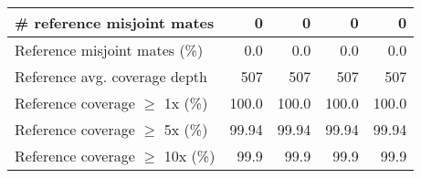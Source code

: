 \documentclass[12pt,a4paper]{article}
\begin{document}
\begin{table}[ht]
\begin{center}
\begin{tabular}{|l*{4}{|r}|}
\# reference misjoint mates & 0 & 0 & 0 & 0 \\ \hline
Reference misjoint mates (\%) & 0.0 & 0.0 & 0.0 & 0.0 \\ \hline
Reference avg. coverage depth & 507 & 507 & 507 & 507 \\ \hline
Reference coverage $\geq$ 1x (\%) & 100.0 & 100.0 & 100.0 & 100.0 \\ \hline
Reference coverage $\geq$ 5x (\%) & 99.94 & 99.94 & 99.94 & 99.94 \\ \hline
Reference coverage $\geq$ 10x (\%) & 99.9 & 99.9 & 99.9 & 99.9 \\ \hline
\end{tabular}
\end{center}
\end{table}
\end{document}
